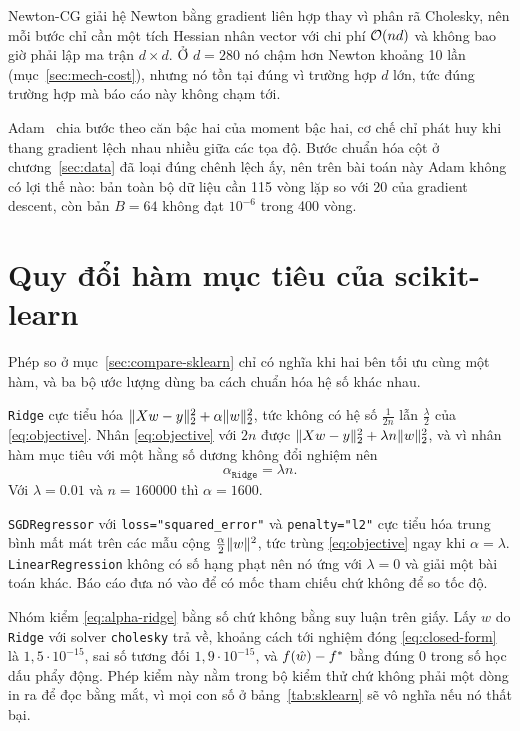 Newton-CG giải hệ Newton bằng gradient liên hợp thay vì phân rã Cholesky, nên mỗi
bước chỉ cần một tích Hessian nhân vector với chi phí $\mathcal{O}(nd)$ và không bao giờ
phải lập ma trận $d \times d$. Ở $d = 280$ nó chậm hơn Newton khoảng 10 lần
(mục~\ref{sec:mech-cost}), nhưng nó tồn tại đúng vì trường hợp $d$ lớn, tức đúng
trường hợp mà báo cáo này không chạm tới.

Adam~\cite{kingma2015adam} chia bước theo căn bậc hai của moment bậc hai, cơ chế chỉ phát huy khi thang
gradient lệch nhau nhiều giữa các tọa độ. Bước chuẩn hóa cột ở
chương~\ref{sec:data} đã loại đúng chênh lệch ấy, nên trên bài toán này Adam
không có lợi thế nào: bản toàn bộ dữ liệu cần 115 vòng lặp so với 20 của gradient
descent, còn bản $B = 64$ không đạt $10^{-6}$ trong 400 vòng.

\chapter{Quy đổi hàm mục tiêu của scikit-learn}
\label{app:conversion}

Phép so ở mục~\ref{sec:compare-sklearn} chỉ có nghĩa khi hai bên tối ưu cùng một
hàm, và ba bộ ước lượng dùng ba cách chuẩn hóa hệ số khác nhau.

\texttt{Ridge} cực tiểu hóa $\lVert Xw-y\rVert_{2}^{2} + \alpha \lVert w\rVert_{2}^{2}$, tức
không có hệ số $\tfrac{1}{2n}$ lẫn $\tfrac{\lambda}{2}$ của
\eqref{eq:objective}. Nhân \eqref{eq:objective} với $2n$ được
$\lVert Xw-y\rVert_{2}^{2} + \lambda n \lVert w\rVert_{2}^{2}$, và vì nhân hàm mục tiêu với
một hằng số dương không đổi nghiệm nên
%
\begin{equation}
  \label{eq:alpha-ridge}
  \alpha_{\texttt{Ridge}} = \lambda n .
\end{equation}
%
Với $\lambda = \num{0.01}$ và $n = \num{160000}$ thì $\alpha = \num{1600}$.

\texttt{SGDRegressor} với \texttt{loss="squared\_error"} và \texttt{penalty="l2"}
cực tiểu hóa trung bình mất mát trên các mẫu cộng $\tfrac{\alpha}{2}\lVert w\rVert^{2}$,
tức trùng \eqref{eq:objective} ngay khi $\alpha = \lambda$. \texttt{LinearRegression}
không có số hạng phạt nên nó ứng với $\lambda = 0$ và giải một bài toán khác.
Báo cáo đưa nó vào để có mốc tham chiếu chứ không để so tốc độ.

Nhóm kiểm \eqref{eq:alpha-ridge} bằng số chứ không bằng suy luận trên giấy. Lấy
$\hat{w}$ do \texttt{Ridge} với solver \texttt{cholesky} trả về, khoảng cách tới
nghiệm đóng \eqref{eq:closed-form} là $1{,}5 \cdot 10^{-15}$, sai số tương đối
$1{,}9 \cdot 10^{-15}$, và $f(\hat{w}) - f^{*}$ bằng đúng 0 trong số học dấu
phẩy động. Phép kiểm này nằm trong bộ kiểm thử chứ không phải một dòng in ra để
đọc bằng mắt, vì mọi con số ở bảng~\ref{tab:sklearn} sẽ vô nghĩa nếu nó thất bại.

